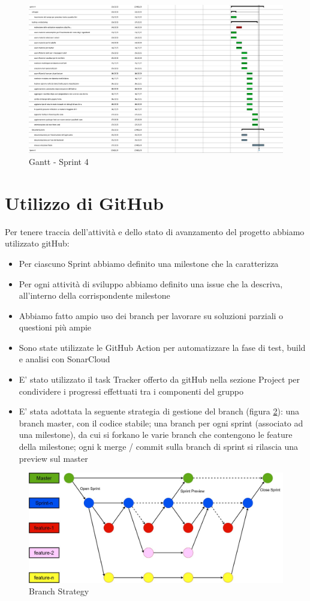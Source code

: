 \documentclass[a4paper,12pt]{report}
\begin{document}
	\begin{figure}[!h]
		\centering
		\includegraphics[width=0.9\linewidth]{image/scrum4.png}
		\caption{Gantt - Sprint 4}\label{fig:scrum4}
	\end{figure}

    	\section{Utilizzo di GitHub}
Per tenere traccia dell'attività e dello stato di avanzamento del progetto abbiamo utilizzato gitHub:
\begin{itemize}
		\item Per ciascuno Sprint abbiamo definito una milestone che la caratterizza
		\item Per ogni attività di sviluppo abbiamo definito una issue che la descriva, all'interno della corrispondente milestone
		\item Abbiamo fatto ampio uso dei branch per lavorare su soluzioni parziali o questioni più ampie
		\item Sono state utilizzate le GitHub Action per automatizzare la fase di test, build e analisi con SonarCloud
		\item E' stato utilizzato il task Tracker offerto da gitHub nella sezione Project per condividere i progressi effettuati tra i componenti del gruppo
		\item E' stata adottata la seguente strategia di gestione del branch (figura \ref{fig:branchStrategy}): una branch master, con il codice stabile; una branch per ogni sprint (associato ad una milestone), da cui si forkano le varie branch che contengono le feature della milestone; ogni k merge / commit sulla branch di sprint si rilascia una preview sul master
	\end{itemize}

	\begin{figure}[!h]
		\centering
		\includegraphics[width=0.9\linewidth]{image/branchStrategy.png}
		\caption{Branch Strategy}\label{fig:branchStrategy}
	\end{figure}
	
\end{document}
